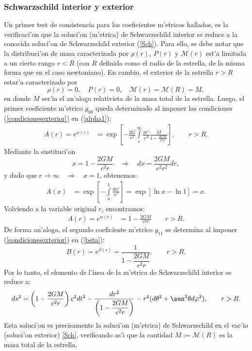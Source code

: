 \subsubsection{Schwarzschild interior y exterior}\label{sec:interiorexterior}
Un primer test de consistencia para los coeficientes m'etricos hallados, es la verificaci'on que la soluci'on (m'etrica) de Schwarzschild interior se reduce a la conocida soluci'on de Schwarzschild exterior (\ref{Sch}). Para ello, se debe notar que la distribuci'on de masa caracterizada por $\rho(r)$, $P(r)$ y $\mathcal{M}(r)$ est'a limitada a un cierto rango $r<R$ (con $R$ definida como el radio de la estrella, de la misma forma que en el caso newtoniano). En cambio, el exterior de la estrella $r>R$ estar'a caracterizado por
\begin{equation}\label{condicionesexterior}
 \rho(r)=0,\quad P(r)=0,\quad \mathcal{M}(r)=\mathcal{M}(R)=M,
\end{equation}
en donde $M$ ser'ia el an'alogo relativista de la masa total de la estrella.
Luego, el primer coeficiente m'etrico $g_{00}$ queda determinado al imponer las condiciones (\ref{condicionesexterior}) en (\ref{alpha1}):
\begin{align}\label{Arext1}
A(r)=e^{\alpha(r)}&=\exp{\left[-\frac{2G}{c^2}\int\limits_r^{\infty}\frac{dr'}{r'^2}\frac{M}{1-\frac{2GM}{c^2r'}}\right]},\qquad r>R.
\end{align}
Mediante la sustituci'on
\begin{equation}
x=1-\frac{2GM}{c^2r}\quad\Rightarrow\quad dx=\frac{2GM}{c^2r^2}dr,
\end{equation}
y dado que $r\to\infty\quad\Rightarrow\quad x=1$, obtenemos:
\begin{align}
A(x)&=\exp\left[-\int\limits_{x}^{1}\frac{dx'}{x'}\right]=\exp\left[\ln x-\ln 1\right]=x.
\end{align}
Volviendo a la variable original $r$, encontramos:
\begin{align} \label{Arext2}
A(r) =e^{\alpha(r)}&= 1-\frac{2GM}{c^2r}\qquad
\text{$r>R$}.
\end{align}
De forma an'aloga, el segundo coeficiente m'etrico $g_{11}$ se determina al imponer (\ref{condicionesexterior}) en (\ref{beta}):
\begin{equation}
 B(r)=e^{\beta(r)}=\dfrac{1}{1-\dfrac{2GM}{c^2r}},\qquad
\text{$r>R$}.
\end{equation}
Por lo tanto, el elemento de l'inea de la m'etrica de Schwarzschild interior se reduce a:
\begin{equation}
 ds^2=\left(1-\dfrac{2GM}{c^2r}\right)c^2dt^2-\dfrac{dr^2}{\left(1-\dfrac{2GM}{c^2r}\right)}-r^2(d\theta^2+\sen^2\theta d\varphi^2),\qquad
\text{$r>R$}.
\end{equation}
Esta soluci'on es precisamente la soluci'on (m'etrica) de Schwarzschild en el vac'io (soluci'on exterior) \eqref{Sch}, verificando as'i que la cantidad $M:=\mathcal{M}(R)$ es la masa total de la estrella.

